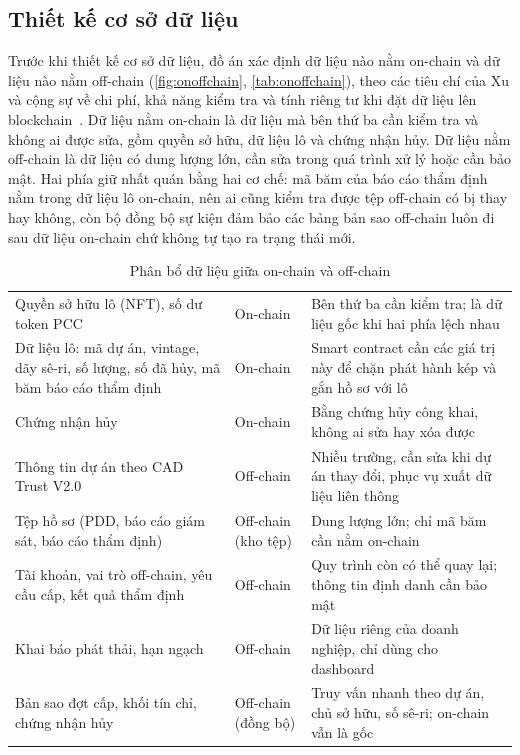 \FloatBarrier
\subsection*{Thiết kế cơ sở dữ liệu}
\label{subsec:tk-csdl}
\label{sec:tk-csdl}
\label{sec:onoffchain}

Trước khi thiết kế cơ sở dữ liệu, đồ án xác định dữ liệu nào nằm on-chain và dữ liệu nào nằm off-chain (\autoref{fig:onoffchain}, \autoref{tab:onoffchain}), theo các tiêu chí của Xu và cộng sự về chi phí, khả năng kiểm tra và tính riêng tư khi đặt dữ liệu lên blockchain~\cite{xu2017taxonomy}. Dữ liệu nằm on-chain là dữ liệu mà bên thứ ba cần kiểm tra và không ai được sửa, gồm quyền sở hữu, dữ liệu lô và chứng nhận hủy. Dữ liệu nằm off-chain là dữ liệu có dung lượng lớn, cần sửa trong quá trình xử lý hoặc cần bảo mật. Hai phía giữ nhất quán bằng hai cơ chế: mã băm của báo cáo thẩm định nằm trong dữ liệu lô on-chain, nên ai cũng kiểm tra được tệp off-chain có bị thay hay không, còn bộ đồng bộ sự kiện đảm bảo các bảng bản sao off-chain luôn đi sau dữ liệu on-chain chứ không tự tạo ra trạng thái mới.

\HinhOnOffChain

\begin{table}[!htbp]
    \centering
    \caption{Phân bổ dữ liệu giữa on-chain và off-chain}
    \label{tab:onoffchain}
    \small
    \begin{tabularx}{\textwidth}{|L{4.6cm}|L{2.6cm}|Y|}
        \hline
         &  &  \\
        \hline
        Quyền sở hữu lô (NFT), số dư token PCC & On-chain & Bên thứ ba cần kiểm tra; là dữ liệu gốc khi hai phía lệch nhau \\
        \hline
        Dữ liệu lô: mã dự án, vintage, dãy sê-ri, số lượng, số đã hủy, mã băm báo cáo thẩm định & On-chain & Smart contract cần các giá trị này để chặn phát hành kép và gắn hồ sơ với lô \\
        \hline
        Chứng nhận hủy & On-chain & Bằng chứng hủy công khai, không ai sửa hay xóa được \\
        \hline
        Thông tin dự án theo CAD Trust V2.0 & Off-chain & Nhiều trường, cần sửa khi dự án thay đổi, phục vụ xuất dữ liệu liên thông \\
        \hline
        Tệp hồ sơ (PDD, báo cáo giám sát, báo cáo thẩm định) & Off-chain (kho tệp) & Dung lượng lớn; chỉ mã băm cần nằm on-chain \\
        \hline
        Tài khoản, vai trò off-chain, yêu cầu cấp, kết quả thẩm định & Off-chain & Quy trình còn có thể quay lại; thông tin định danh cần bảo mật \\
        \hline
        Khai báo phát thải, hạn ngạch & Off-chain & Dữ liệu riêng của doanh nghiệp, chỉ dùng cho dashboard \\
        \hline
        Bản sao đợt cấp, khối tín chỉ, chứng nhận hủy & Off-chain (đồng bộ) & Truy vấn nhanh theo dự án, chủ sở hữu, số sê-ri; on-chain vẫn là gốc \\
        \hline
    \end{tabularx}
\end{table}

